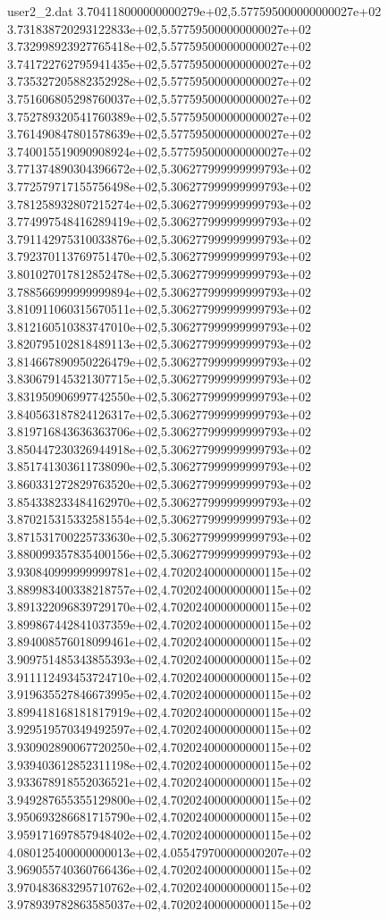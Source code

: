 \begin{filecontents}{user2_2.dat}
3.704118000000000279e+02,5.577595000000000027e+02
3.731838720293122833e+02,5.577595000000000027e+02
3.732998923927765418e+02,5.577595000000000027e+02
3.741722762795941435e+02,5.577595000000000027e+02
3.735327205882352928e+02,5.577595000000000027e+02
3.751606805298760037e+02,5.577595000000000027e+02
3.752789320541760389e+02,5.577595000000000027e+02
3.761490847801578639e+02,5.577595000000000027e+02
3.740015519090908924e+02,5.577595000000000027e+02
3.771374890304396672e+02,5.306277999999999793e+02
3.772579717155756498e+02,5.306277999999999793e+02
3.781258932807215274e+02,5.306277999999999793e+02
3.774997548416289419e+02,5.306277999999999793e+02
3.791142975310033876e+02,5.306277999999999793e+02
3.792370113769751470e+02,5.306277999999999793e+02
3.801027017812852478e+02,5.306277999999999793e+02
3.788566999999999894e+02,5.306277999999999793e+02
3.810911060315670511e+02,5.306277999999999793e+02
3.812160510383747010e+02,5.306277999999999793e+02
3.820795102818489113e+02,5.306277999999999793e+02
3.814667890950226479e+02,5.306277999999999793e+02
3.830679145321307715e+02,5.306277999999999793e+02
3.831950906997742550e+02,5.306277999999999793e+02
3.840563187824126317e+02,5.306277999999999793e+02
3.819716843636363706e+02,5.306277999999999793e+02
3.850447230326944918e+02,5.306277999999999793e+02
3.851741303611738090e+02,5.306277999999999793e+02
3.860331272829763520e+02,5.306277999999999793e+02
3.854338233484162970e+02,5.306277999999999793e+02
3.870215315332581554e+02,5.306277999999999793e+02
3.871531700225733630e+02,5.306277999999999793e+02
3.880099357835400156e+02,5.306277999999999793e+02
3.930840999999999781e+02,4.702024000000000115e+02
3.889983400338218757e+02,4.702024000000000115e+02
3.891322096839729170e+02,4.702024000000000115e+02
3.899867442841037359e+02,4.702024000000000115e+02
3.894008576018099461e+02,4.702024000000000115e+02
3.909751485343855393e+02,4.702024000000000115e+02
3.911112493453724710e+02,4.702024000000000115e+02
3.919635527846673995e+02,4.702024000000000115e+02
3.899418168181817919e+02,4.702024000000000115e+02
3.929519570349492597e+02,4.702024000000000115e+02
3.930902890067720250e+02,4.702024000000000115e+02
3.939403612852311198e+02,4.702024000000000115e+02
3.933678918552036521e+02,4.702024000000000115e+02
3.949287655355129800e+02,4.702024000000000115e+02
3.950693286681715790e+02,4.702024000000000115e+02
3.959171697857948402e+02,4.702024000000000115e+02
4.080125400000000013e+02,4.055479700000000207e+02
3.969055740360766436e+02,4.702024000000000115e+02
3.970483683295710762e+02,4.702024000000000115e+02
3.978939782863585037e+02,4.702024000000000115e+02

\end{filecontents}
